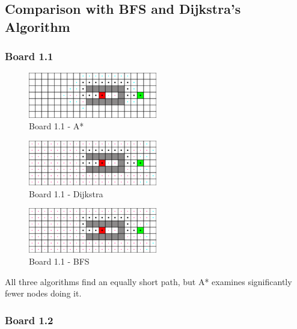 \newpage

\subsection*{Comparison with BFS and Dijkstra's Algorithm}

\subsubsection*{Board 1.1}

\begin{figure}[h!]
  \centering
    \includegraphics[width=0.5\textwidth]{img/board-1-1-astar}
    \caption{Board 1.1 - A*}
\end{figure}

\begin{figure}[h!]
  \centering
    \includegraphics[width=0.5\textwidth]{img/board-1-1-dijkstra}
    \caption{Board 1.1 - Dijkstra}
\end{figure}

\begin{figure}[h!]
  \centering
    \includegraphics[width=0.5\textwidth]{img/board-1-1-bfs}
    \caption{Board 1.1 - BFS}
\end{figure}

All three algorithms find an equally short path, but A* examines significantly
fewer nodes doing it.

\newpage

\subsubsection*{Board 1.2}

